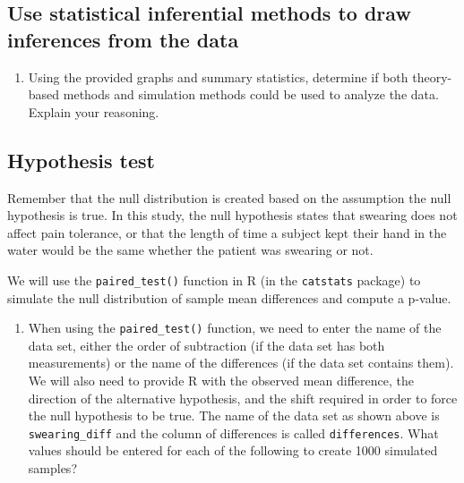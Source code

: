 \documentclass[
]{report}
\providecommand{\tightlist}{%
  \setlength{\itemsep}{0pt}\setlength{\parskip}{0pt}}
\begin{document}
\vspace{0.5in}

\hypertarget{use-statistical-inferential-methods-to-draw-inferences-from-the-data-2}{%
\subsection*{Use statistical inferential methods to draw inferences from the data}\label{use-statistical-inferential-methods-to-draw-inferences-from-the-data-2}}

\begin{enumerate}
\def\labelenumi{\arabic{enumi}.}
\setcounter{enumi}{9}
\tightlist
\item
  Using the provided graphs and summary statistics, determine if both theory-based methods and simulation methods could be used to analyze the data. Explain your reasoning.
\end{enumerate}

\vspace{0.8in}

\hypertarget{hypothesis-test-1}{%
\subsection*{Hypothesis test}\label{hypothesis-test-1}}

Remember that the null distribution is created based on the assumption the null hypothesis is true. In this study, the null hypothesis states that swearing does not affect pain tolerance, or that the length of time a subject kept their hand in the water would be the same whether the patient was swearing or not.

We will use the \texttt{paired\_test()} function in R (in the \texttt{catstats} package) to simulate the null distribution of sample mean differences and compute a p-value.

\begin{enumerate}
\def\labelenumi{\arabic{enumi}.}
\setcounter{enumi}{10}
\tightlist
\item
  When using the \texttt{paired\_test()} function, we need to enter the name of the data set, either the order of subtraction (if the data set has both measurements) or the name of the differences (if the data set contains them). We will also need to provide R with the observed mean difference, the direction of the alternative hypothesis, and the shift required in order to force the null hypothesis to be true. The name of the data set as shown above is \texttt{swearing\_diff} and the column of differences is called \texttt{differences}. What values should be entered for each of the following to create 1000 simulated samples?
\end{enumerate}
\end{document}
